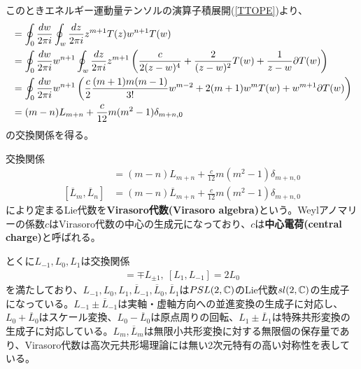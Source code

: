このときエネルギー運動量テンソルの演算子積展開(\ref{TTOPE})より、
\begin{align}
[L_m,L_n]&=\oint_{0}\frac{dw}{2\pi i}\oint_{w}\frac{dz}{2\pi i}z^{m+1}T(z)w^{n+1}T(w)\notag\\
&=\oint_{0}\frac{dw}{2\pi i}w^{n+1}\oint_{w}\frac{dz}{2\pi i}z^{m+1}\left( \frac{c}{2(z-w)^4}+\frac{2}{(z-w)^2}T(w)+\frac{1}{z-w}\del T(w) \right)\notag\\
&=\oint_{0}\frac{dw}{2\pi i}w^{n+1} \left( \frac{c}{2}\frac{(m+1)m(m-1)}{3!}w^{m-2}+2(m+1)w^mT(w)+w^{m+1}\del T(w)\right)\notag\\
&=(m-n)L_{m+n}+\frac{c}{12}m(m^2-1)\delta_{m+n,0}
\end{align}
の交換関係を得る。

\begin{oframed}
交換関係
\begin{align}
[L_m,L_n]&=(m-n)L_{m+n}+\frac{c}{12}m(m^2-1)\delta_{m+n,0}\\
[\overline{L}_m,\overline{L}_n]&=(m-n)\overline{L}_{m+n}+\frac{c}{12}m(m^2-1)\delta_{m+n,0}
\end{align}
により定まるLie代数を\textbf{Virasoro代数(Virasoro algebra)}という。Weylアノマリーの係数$c$はVirasoro代数の中心の生成元になっており、$c$は\textbf{中心電荷(central charge)}と呼ばれる。
\end{oframed}

とくに$L_{-1},L_0,L_1$は交換関係
\begin{align}
[L_0,L_{\pm 1}]=\mp L_{\pm 1},\ [L_1,L_{-1}]=2L_0
\end{align}
を満たしており、$L_{-1},L_0,L_1,\overline{L}_{-1},\overline{L}_0,\overline{L}_1$は$PSL(2,\mathbb{C})$のLie代数$sl(2,\mathbb{C})$の生成子になっている。$L_{-1}\pm \overline{L}_{-1}$は実軸・虚軸方向への並進変換の生成子に対応し、$L_0+\overline{L}_0$はスケール変換、$L_0-\overline{L}_0$は原点周りの回転、$L_1\pm \overline{L}_1$は特殊共形変換の生成子に対応している。$L_m,\overline{L}_m$は無限小共形変換に対する無限個の保存量であり、Virasoro代数は高次元共形場理論には無い2次元特有の高い対称性を表している。

